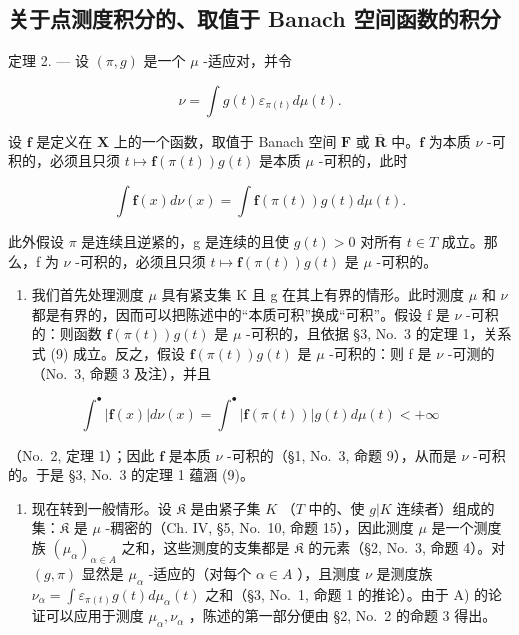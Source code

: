 \subsection{关于点测度积分的、取值于 Banach 空间函数的积分}

定理 2. --- 设 \((\pi, g)\) 是一个 \(\mu\) -适应对，并令

\[
\nu = \int g (t) \varepsilon_ {\pi (t)} d \mu (t).
\]

设 \(\mathbf{f}\) 是定义在 \(\mathbf{X}\) 上的一个函数，取值于 Banach 空间 \(\mathbf{F}\) 或 \(\overline{\mathbf{R}}\) 中。\(\mathbf{f}\) 为本质 \(\nu\) -可积的，必须且只须 \(t \mapsto \mathbf{f}(\pi(t))g(t)\) 是本质 \(\mu\) -可积的，此时

\[
\int \mathbf {f} (x) d \nu (x) = \int \mathbf {f} (\pi (t)) g (t) d \mu (t).\tag{9}
\]

此外假设 \(\pi\) 是连续且逆紧的，g 是连续的且使 \(g(t) > 0\) 对所有 \(t \in T\) 成立。那么，f 为 \(\nu\) -可积的，必须且只须 \(t \mapsto \mathbf{f}(\pi(t))g(t)\) 是 \(\mu\) -可积的。

\begin{enumerate}
\def\labelenumi{\Alph{enumi})}
\tightlist
\item
  我们首先处理测度 \(\mu\) 具有紧支集 K 且 g 在其上有界的情形。此时测度 \(\mu\) 和 \(\nu\) 都是有界的，因而可以把陈述中的“本质可积”换成“可积”。假设 f 是 \(\nu\) -可积的：则函数 \(\mathbf{f}(\pi(t))g(t)\) 是 \(\mu\) -可积的，且依据 §3, No.~3 的定理 1，关系式 (9) 成立。反之，假设 \(\mathbf{f}(\pi(t))g(t)\) 是 \(\mu\) -可积的：则 f 是 \(\nu\) -可测的（No.~3, 命题 3 及注），并且
\end{enumerate}

\[
\int^ {\bullet} | \mathbf {f} (x) | d \nu (x) = \int^ {\bullet} | \mathbf {f} (\pi (t)) | g (t) d \mu (t) <   + \infty
\]

（No.~2, 定理 1）；因此 \(\mathbf{f}\) 是本质 \(\nu\) -可积的（§1, No.~3, 命题 9），从而是 \(\nu\) -可积的。于是 §3, No.~3 的定理 1 蕴涵 (9)。

\begin{enumerate}
\def\labelenumi{\Alph{enumi})}
\setcounter{enumi}{1}
\tightlist
\item
  现在转到一般情形。设 \(\mathfrak{K}\) 是由紧子集 \(K\) （\(T\) 中的、使 \(g|K\) 连续者）组成的集：\(\mathfrak{K}\) 是 \(\mu\) -稠密的（Ch. IV, §5, No.~10, 命题 15），因此测度 \(\mu\) 是一个测度族 \((\mu_{\alpha})_{\alpha \in A}\) 之和，这些测度的支集都是 \(\mathfrak{K}\) 的元素（§2, No.~3, 命题 4）。对 \((g,\pi)\) 显然是 \(\mu_{\alpha}\) -适应的（对每个 \(\alpha \in A\) ），且测度 \(\nu\) 是测度族 \(\nu_{\alpha} = \int \varepsilon_{\pi(t)} g(t) d\mu_{\alpha}(t)\) 之和（§3, No.~1, 命题 1 的推论）。由于 A) 的论证可以应用于测度 \(\mu_{\alpha}, \nu_{\alpha}\) ，陈述的第一部分便由 §2, No.~2 的命题 3 得出。
\end{enumerate}

